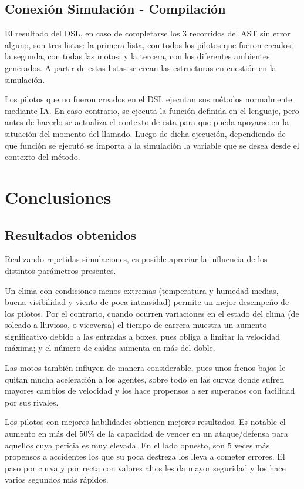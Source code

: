\documentclass[12pt, letterpaper,spanish]{article}
\theoremstyle{definition}
\theoremstyle{remark}
\begin{document}
	\subsection{Conexión Simulación - Compilación}
	El resultado del DSL, en caso de completarse los 3 recorridos del AST sin error alguno, son tres listas: la primera lista, con todos los pilotos que fueron creados; la segunda, con todas las motos; y la tercera, con los diferentes ambientes generados. A partir de estas listas se crean las estructuras en cuestión en la simulación.

        Los pilotos que no fueron creados en el DSL ejecutan sus métodos normalmente mediante IA. En caso contrario, se ejecuta la función definida en el lenguaje, pero antes de hacerlo se actualiza el contexto de esta para que pueda apoyarse en la situación del momento del llamado. Luego de dicha ejecución, dependiendo de que función se ejecutó se importa a la simulación la variable que se desea desde el contexto del método.

\newpage

\section{Conclusiones}

	\subsection{Resultados obtenidos}
	Realizando repetidas simulaciones, es posible apreciar la influencia de los distintos parámetros presentes.

	Un clima con condiciones menos extremas (temperatura y humedad medias, buena visibilidad y viento de poca intensidad) permite un mejor desempeño de los pilotos. Por el contrario, cuando ocurren variaciones en el estado del clima (de soleado a lluvioso, o viceversa) el tiempo de carrera muestra un aumento significativo debido a las entradas a boxes, pues obliga a limitar la velocidad máxima; y el número de caídas aumenta en más del doble.

	Las motos también influyen de manera considerable, pues unos frenos bajos le quitan mucha aceleración a los agentes, sobre todo en las curvas donde sufren mayores cambios de velocidad y los hace propensos a ser superados con facilidad por sus rivales.

	Los pilotos con mejores habilidades obtienen mejores resultados. Es notable el aumento en más del $50\%$ de la capacidad de vencer en un ataque/defensa para aquellos cuya pericia es muy elevada. En el lado opuesto, son $5$ veces más propensos a accidentes los que su poca destreza los lleva a cometer errores. El paso por curva y por recta con valores altos les da mayor seguridad y los hace varios segundos más rápidos.
\end{document}
